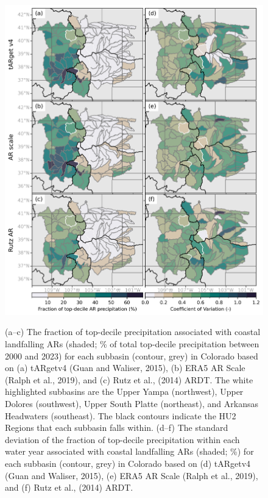 \documentclass[draft]{agujournal2019}
\begin{document}
\begin{figure}
\includegraphics{fig3.png}
\label{fig:choropleth}
\caption{(a–c) The fraction of top-decile precipitation associated with coastal landfalling ARs (shaded; \% of total top-decile precipitation between 2000 and 2023) for each subbasin (contour, grey) in Colorado based on (a) tARgetv4 (Guan and Waliser, 2015), (b) ERA5 AR Scale (Ralph et al., 2019), and (c) Rutz et al., (2014) ARDT. The white highlighted subbasins are the Upper Yampa (northwest), Upper Dolores (southwest), Upper South Platte (northeast), and Arkansas Headwaters (southeast). The black contours indicate the HU2 Regions that each subbasin falls within. (d–f) The standard deviation of the fraction of top-decile precipitation within each water year associated with coastal landfalling ARs (shaded; \%) for each subbasin (contour, grey) in Colorado based on (d)  tARgetv4 (Guan and Waliser, 2015), (e) ERA5 AR Scale (Ralph et al., 2019), and (f) Rutz et al., (2014) ARDT. }
\end{figure}

%
%
%
\end{document}
